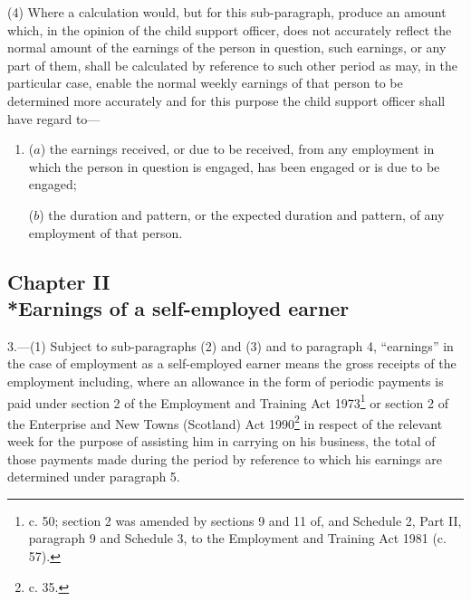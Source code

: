 \documentclass[12pt,a4paper]{article}
\begin{document}
(4) Where a calculation would, but for this sub-paragraph, produce an amount which, in the opinion of the child support officer, does not accurately reflect the normal amount of the earnings of the person in question, such earnings, or any part of them, shall be calculated by reference to such other period as may, in the particular case, enable the normal weekly earnings of that person to be determined more accurately and for this purpose the child support officer shall have regard to—
\begin{enumerate}\item[]
($a$) the earnings received, or due to be received, from any employment in which the person in question is engaged, has been engaged or is due to be engaged;

($b$) the duration and pattern, or the expected duration and pattern, of any employment of that person.
\end{enumerate}


\subsection[Chapter II --- Earnings of a self-employed earner]{Chapter II\\*Earnings of a self-employed earner}

\renewcommand\parthead{--- Schedule 1 Part I Chapter II}

3.—(1) Subject to sub-paragraphs (2) and (3) and to paragraph 4, “earnings” in the case of employment as a self-employed earner means the gross receipts of the employment including, where an allowance in the form of periodic payments is paid under section 2 of the Employment and Training Act 1973\footnote{ c. 50; section 2 was amended by sections 9 and 11 of, and Schedule 2, Part II, paragraph 9 and Schedule 3, to the Employment and Training Act 1981 (c. 57).} or section 2 of the Enterprise and New Towns (Scotland) Act 1990\footnote{ c. 35.} in respect of the relevant week for the purpose of assisting him in carrying on his business, the total of those payments made during the period by reference to which his earnings are determined under paragraph 5.
\end{document}
